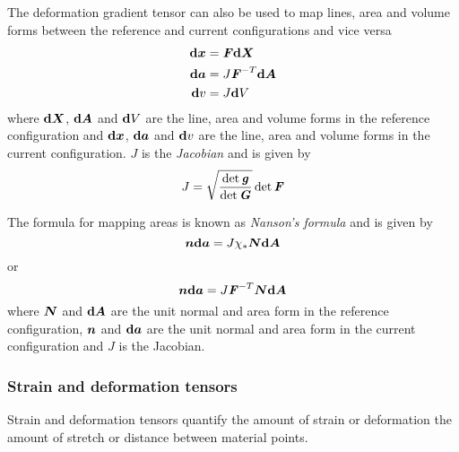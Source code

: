 The deformation gradient tensor can also be used to map lines, area and volume forms
between the reference and current configurations and vice versa \ie
\begin{align}
    \boldsymbol{\mathrm{d}} \boldsymbol{x}  &= \boldsymbol{\mathit{F}}  \boldsymbol{\mathrm{d}} \boldsymbol{X}  \\
    \boldsymbol{\mathrm{d}} \boldsymbol{a}  &= J {\boldsymbol{\mathit{F}}}^{-T}   \boldsymbol{\mathrm{d}} \boldsymbol{A}  \\
    \boldsymbol{\mathrm{d}}  v  &= J  \boldsymbol{\mathrm{d}}  V 
\end{align}
where $  \boldsymbol{\mathrm{d}} \boldsymbol{X} $, $  \boldsymbol{\mathrm{d}} \boldsymbol{A} $ and
$  \boldsymbol{\mathrm{d}}  V $ are the line, area and volume forms in the reference
configuration and $  \boldsymbol{\mathrm{d}} \boldsymbol{x} $, $  \boldsymbol{\mathrm{d}} \boldsymbol{a} $ and
$  \boldsymbol{\mathrm{d}}  v $ are the line, area and volume forms in the current
configuration. $J$ is the \emph{Jacobian} and is given by
\begin{equation}
  J=\sqrt{\dfrac{\det{\ensuremath{\boldsymbol{\mathit{g}}}}}{\det{\ensuremath{\boldsymbol{\mathit{G}}}}}}\det{\ensuremath{\boldsymbol{\mathit{F}}}}
\end{equation}

The formula for mapping areas is known as \emph{Nanson's formula} and is
given by
\begin{equation}
  \boldsymbol{n}  \boldsymbol{\mathrm{d}} \boldsymbol{a} =J \chi_{*}\boldsymbol{N}  \boldsymbol{\mathrm{d}} \boldsymbol{A}  
\end{equation}
or
\begin{equation}
  \boldsymbol{n}  \boldsymbol{\mathrm{d}} \boldsymbol{a} =J {\boldsymbol{\mathit{F}}}^{-T} \boldsymbol{N}  \boldsymbol{\mathrm{d}} \boldsymbol{A} 
\end{equation}
where $\boldsymbol{N}$ and $  \boldsymbol{\mathrm{d}} \boldsymbol{A} $ are the unit normal and
area form in the reference configuration,  $\boldsymbol{n}$ and $  \boldsymbol{\mathrm{d}} \boldsymbol{a} $ are the unit normal and
area form in the current configuration and $J$ is the Jacobian. 
  
\subsubsection{Strain and deformation tensors}

Strain and deformation tensors quantify the amount of strain or deformation
\ie the amount of stretch or distance between material points.  

